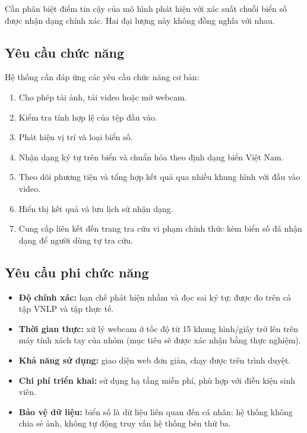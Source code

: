 Cần phân biệt điểm tin cậy của mô hình phát hiện với xác suất chuỗi biển số được nhận dạng chính xác. Hai đại lượng này không đồng nghĩa với nhau.

\subsection{Yêu cầu chức năng}

Hệ thống cần đáp ứng các yêu cầu chức năng cơ bản:

\begin{enumerate}
  \item Cho phép tải ảnh, tải video hoặc mở webcam.
  \item Kiểm tra tính hợp lệ của tệp đầu vào.
  \item Phát hiện vị trí và loại biển số.
  \item Nhận dạng ký tự trên biển và chuẩn hóa theo định dạng biển Việt Nam.
  \item Theo dõi phương tiện và tổng hợp kết quả qua nhiều khung hình với đầu vào video.
  \item Hiển thị kết quả và lưu lịch sử nhận dạng.
  \item Cung cấp liên kết đến trang tra cứu vi phạm chính thức kèm biển số đã nhận dạng để người dùng tự tra cứu.
\end{enumerate}

\subsection{Yêu cầu phi chức năng}

\begin{itemize}
  \item \textbf{Độ chính xác:} hạn chế phát hiện nhầm và đọc sai ký tự; được đo trên cả tập VNLP và tập thực tế.
  \item \textbf{Thời gian thực:} xử lý webcam ở tốc độ từ 15 khung hình/giây trở lên trên máy tính xách tay của nhóm (mục tiêu sẽ được xác nhận bằng thực nghiệm).
  \item \textbf{Khả năng sử dụng:} giao diện web đơn giản, chạy được trên trình duyệt.
  \item \textbf{Chi phí triển khai:} sử dụng hạ tầng miễn phí, phù hợp với điều kiện sinh viên.
  \item \textbf{Bảo vệ dữ liệu:} biển số là dữ liệu liên quan đến cá nhân; hệ thống không chia sẻ ảnh, không tự động truy vấn hệ thống bên thứ ba.
\end{itemize}

